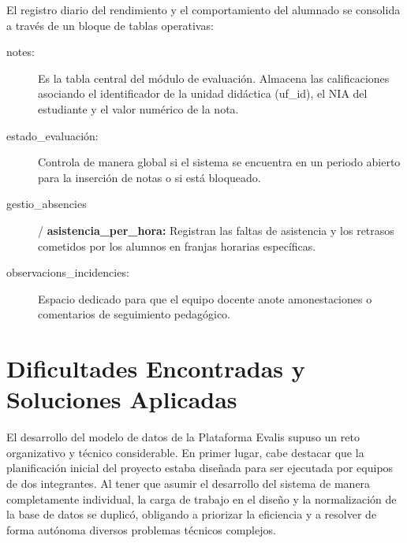 \documentclass[spanish]{report}
\begin{document}
El registro diario del rendimiento y el comportamiento del alumnado
se consolida a través de un bloque de tablas operativas:
\begin{description}
\item [{notes:}] Es la tabla central del módulo de evaluación. Almacena
las calificaciones asociando el identificador de la unidad didáctica
(uf\_id), el NIA del estudiante y el valor numérico de la nota.
\item [{estado\_evaluación:}] Controla de manera global si el sistema se
encuentra en un periodo abierto para la inserción de notas o si está
bloqueado.
\item [{gestio\_absencies}] / \textbf{asistencia\_per\_hora: }Registran
las faltas de asistencia y los retrasos cometidos por los alumnos
en franjas horarias específicas.
\item [{observacions\_incidencies:}] Espacio dedicado para que el equipo
docente anote amonestaciones o comentarios de seguimiento pedagógico.
\end{description}

\section{Dificultades Encontradas y Soluciones Aplicadas}

El desarrollo del modelo de datos de la Plataforma Evalis supuso un
reto organizativo y técnico considerable. En primer lugar, cabe destacar
que la planificación inicial del proyecto estaba diseñada para ser
ejecutada por equipos de dos integrantes. Al tener que asumir el desarrollo
del sistema de manera completamente individual, la carga de trabajo
en el diseño y la normalización de la base de datos se duplicó, obligando
a priorizar la eficiencia y a resolver de forma autónoma diversos
problemas técnicos complejos.
\end{document}
